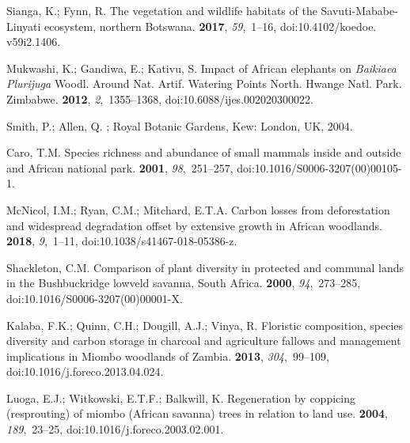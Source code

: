 \documentclass[diversity,article,accept,moreauthors,pdftex]{Definitions/mdpi}
\begin{document}
\begin{thebibliography}{999}
Sianga, K.; Fynn, R.
\newblock The vegetation and wildlife habitats of the {Savuti-Mababe-Linyati}
  ecosystem, northern {Botswana}.
 {\bf 2017}, {\em 59},~1--16,
\newblock
  doi:10.4102/koedoe. v59i2.1406.

Mukwashi, K.; Gandiwa, E.; Kativu, S.
\newblock Impact of {African} elephants on {\textit{Baikiaea Plurijuga}} Woodl. Around Nat. Artif. Watering Points North. {Hwange Natl. Park. Zimbabwe}. {\bf 2012},
  {\em 2},~1355--1368, doi:10.6088/ijes.002020300022.

Smith, P.; Allen, Q.
;
  Royal Botanic Gardens, Kew: London, UK,  2004.

Caro, T.M.
\newblock Species richness and abundance of small mammals inside and outside
  and {African} national park.
 {\bf 2001}, {\em 98},~251--257, doi:10.1016/S0006-3207(00)00105-1.

{McNicol}, I.M.; Ryan, C.M.; Mitchard, E.T.A.
\newblock Carbon losses from deforestation and widespread degradation offset by
  extensive growth in {African} woodlands.
 {\bf 2018}, {\em 9},~1--11, doi:10.1038/s41467-018-05386-z.

Shackleton, C.M.
\newblock Comparison of plant diversity in protected and communal lands in the
  {Bushbuckridge} lowveld savanna, {South Africa}.
 {\bf 2000}, {\em 94},~273--285, doi:10.1016/S0006-3207(00)00001-X.

Kalaba, F.K.; Quinn, C.H.; Dougill, A.J.; Vinya, R.
\newblock Floristic composition, species diversity and carbon storage in
  charcoal and agriculture fallows and management implications in Miombo
  woodlands of {Zambia}.
 {\bf 2013}, {\em 304},~99--109, doi:10.1016/j.foreco.2013.04.024.

Luoga, E.J.; Witkowski, E.T.F.; Balkwill, K.
\newblock Regeneration by coppicing (resprouting) of miombo ({African} savanna)
  trees in relation to land use.
 {\bf 2004}, {\em 189},~23--25, doi:10.1016/j.foreco.2003.02.001.


\end{thebibliography}
\end{document}
